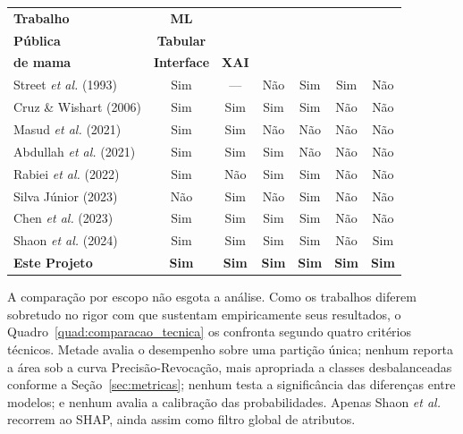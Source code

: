 \documentclass[
    12pt
    ,oneside
    ,a4paper
    ,chapter=TITLE
    ,section=TITLE
    ,sumario=abnt-6027-2012
    ,english,brazil]{abntex2} %
\begin{document}
\begin{quadro}[ht]
    \centering
    \begin{tabular}{|l|c|c|c|c|c|c|}
        \hline
        \textbf{Trabalho} & \textbf{ML} & \makecell{\textbf{Base}\\\textbf{Pública}}
        & \textbf{Tabular} & \makecell{\textbf{Câncer}\\\textbf{de mama}}
        & \textbf{Interface} & \textbf{XAI} \\
        \hline
        Street \textit{et al.} (1993)   & Sim & --- & Não & Sim & Sim & Não \\ \hline
        Cruz \& Wishart (2006) & Sim & Sim & Sim & Sim & Não & Não \\ \hline
        Masud \textit{et al.} (2021)    & Sim & Sim & Não & Não & Não & Não \\ \hline
        Abdullah \textit{et al.} (2021)        & Sim & Sim & Sim & Não & Não & Não \\ \hline
        Rabiei \textit{et al.} (2022)   & Sim & Não & Sim & Sim & Não & Não \\ \hline
        Silva Júnior (2023)    & Não & Sim & Não & Sim & Não & Não \\ \hline
        Chen \textit{et al.} (2023)     & Sim & Sim & Sim & Sim & Não & Não \\ \hline
        Shaon \textit{et al.} (2024)    & Sim & Sim & Sim & Sim & Não & Sim \\ \hline
        \textbf{Este Projeto}  & \textbf{Sim} & \textbf{Sim} & \textbf{Sim} & \textbf{Sim} & \textbf{Sim} & \textbf{Sim} \\ \hline
    \end{tabular}
    \vspace{0.2cm}
    \fonteautor
\end{quadro}

A comparação por escopo não esgota a análise. Como os trabalhos diferem
sobretudo no rigor com que sustentam empiricamente seus resultados, o
Quadro~\ref{quad:comparacao_tecnica} os confronta segundo quatro critérios
técnicos. Metade avalia o desempenho sobre uma partição única; nenhum reporta a
área sob a curva Precisão-Revocação, mais apropriada a classes desbalanceadas
conforme a Seção~\ref{sec:metricas}; nenhum testa a significância das diferenças
entre modelos; e nenhum avalia a calibração das probabilidades. Apenas Shaon
\textit{et al.} recorrem ao SHAP, ainda assim como filtro global de atributos.
\end{document}
